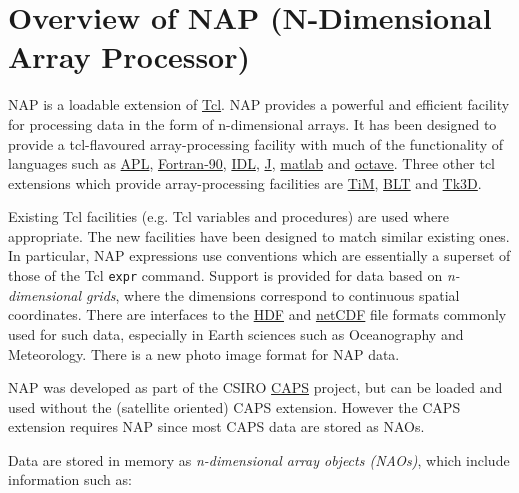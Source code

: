     \section{Overview of NAP (N-Dimensional Array Processor)}
\label{overview}

  \par NAP is a loadable extension of 
  \href{http://wiki.tcl.tk/}{Tcl}. NAP provides a powerful and
  efficient facility for processing data in the form of n-dimensional
  arrays. It has been designed to provide a tcl-flavoured
  array-processing facility with much of the functionality of languages
  such as 
  \href{http://www.acm.org/sigapl/}{APL}, 
  \href{http://www.fortran.com/fortran/}{Fortran-90}, 
  \href{http://www.rsinc.com/idl/index.asp}{IDL}, 
  \href{http://www.jsoftware.com/}{J}, 
  \href{http://www.mathworks.com/}{matlab} and 
  \href{http://www.octave.org/}{octave}. Three other tcl
  extensions which provide array-processing facilities are 
  \href{http://www-obs.univ-lyon1.fr/\%7Ethiebaut/TiM/TiM.html}{TiM},
  \href{http://sourceforge.net/projects/blt/}{BLT} and 
  \href{http://www.gm.com/automotive/innovations/rnd/TK3/TK3D-Software-Description.html}{ Tk3D}.
  \par Existing Tcl facilities (e.g. Tcl variables and procedures) are
  used where appropriate. The new facilities have been designed to
  match similar existing ones. In particular, NAP expressions use
  conventions which are essentially a superset of those of the Tcl 
  \texttt{expr} command. Support is provided for data based on 
  \emph{n-dimensional grids}, where the dimensions correspond to
  continuous spatial coordinates. There are interfaces to the 
  \href{http://hdf.ncsa.uiuc.edu}{HDF} and 
  \href{http://www.unidata.ucar.edu/packages/netcdf/index.html}{netCDF}
  file formats commonly used for such data, especially in Earth
  sciences such as Oceanography and Meteorology. There is a new photo
  image format for NAP data.
  \par NAP was developed as part of the CSIRO 
  \href{http://www.dar.csiro.au/rs/avhrr-processing-software.htm}{CAPS}
  project, but can be loaded and used without the (satellite oriented)
  CAPS extension. However the CAPS extension requires NAP since most
  CAPS data are stored as NAOs.
  \par Data are stored in memory as 
  \emph{n-dimensional array objects (NAOs)}, which include
  information such as:
